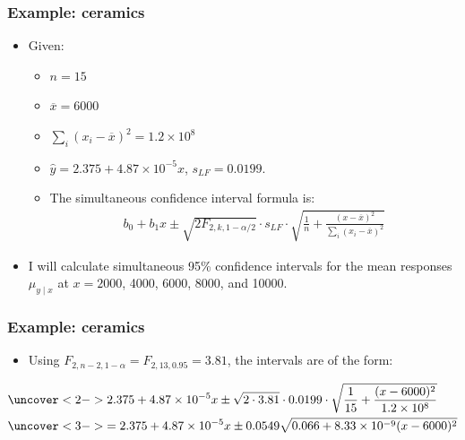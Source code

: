 \documentclass[handout]{beamer}\usepackage[]{graphicx}\usepackage[]{color}
\providecommand{\ov}[1]{\overline{#1}}
\providecommand{\wh}[1]{\widehat{#1}}
\numberwithin{equation}{section}
\begin{document}
\begin{frame}
\frametitle{Example: ceramics}
\begin{itemize}
\item Given:
\begin{itemize}
\pause \item $n = 15$
\pause \item $\ov{x} = 6000$
\pause \item $\sum_i(x_i - \ov{x})^2 = 1.2\times 10^8$
\pause \item $\wh{y} = 2.375 + 4.87 \times 10^{-5} x$, $s_{LF} = 0.0199$.
\pause \item The simultaneous confidence interval formula is:
\pause \begin{align*}
b_0 + b_1 x \pm \sqrt{2 F_{2, k, 1 - \alpha/2}}  \cdot s_{LF} \cdot \sqrt{ \frac{1}{n} + \frac{(x - \ov{x})^2}{\sum_i(x_i - \ov{x})^2}}
\end{align*}
\end{itemize}
\pause \item I will calculate simultaneous 95\% confidence intervals for the mean responses $\mu_{y \mid x}$ at $x = 2000$, 4000, 6000, 8000, and 10000.
\end{itemize}
\end{frame}

\begin{frame}
\frametitle{Example: ceramics} \small
\begin{itemize}
\item Using $F_{2, n-2, 1 - \alpha} = F_{2, 13, 0.95} = 3.81$, the intervals are of the form:
\end{itemize}
\begin{align*}
&\uncover<2->{2.375 + 4.87 \times 10^{-5} x \pm \sqrt{2 \cdot 3.81} \cdot 0.0199 \cdot \sqrt{ \frac{1}{15} + \frac{(x - 6000)^2}{1.2 \times 10^8}}} \\
&\uncover<3->{= 2.375 + 4.87 \times 10^{-5} x \pm 0.0549 \sqrt{0.066 + 8.33 \times 10^{-9} (x - 6000)^2}}
\end{align*}

\begin{center}
\end{center}
\end{frame}
\end{document}
